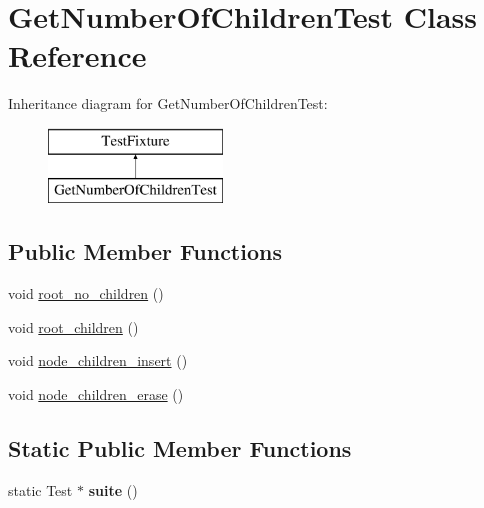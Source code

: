 \hypertarget{class_get_number_of_children_test}{}\section{Get\+Number\+Of\+Children\+Test Class Reference}
\label{class_get_number_of_children_test}
Inheritance diagram for Get\+Number\+Of\+Children\+Test\+:\begin{figure}[H]
\begin{center}
\leavevmode
\includegraphics[height=2.000000cm]{class_get_number_of_children_test}
\end{center}
\end{figure}
\subsection*{Public Member Functions}
\begin{DoxyCompactItemize}
\item 
void \hyperlink{class_get_number_of_children_test_ab43b852fd1b487614fbb1799b54f723a}{root\+\_\+no\+\_\+children} ()
\item 
void \hyperlink{class_get_number_of_children_test_abf650bd374f47d9687109fb0022e5f21}{root\+\_\+children} ()
\item 
void \hyperlink{class_get_number_of_children_test_a0930a6f25c1f9d47424aab20a1733eb3}{node\+\_\+children\+\_\+insert} ()
\item 
void \hyperlink{class_get_number_of_children_test_ab19f7ecb2b671bc44fdfb2947deee52a}{node\+\_\+children\+\_\+erase} ()
\end{DoxyCompactItemize}
\subsection*{Static Public Member Functions}
\begin{DoxyCompactItemize}
\item 
\mbox{\label{class_get_number_of_children_test_a348017e90bc30a00737ea03bfb44820d}} 
static Test $\ast$ {\bfseries suite} ()
\end{DoxyCompactItemize}


